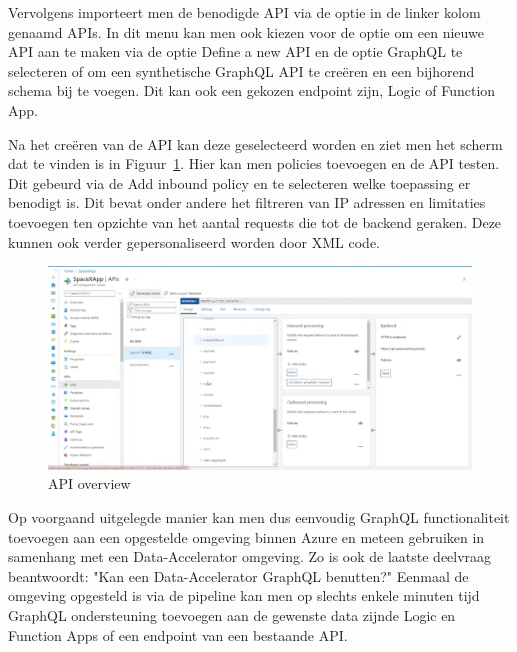 Vervolgens importeert men de benodigde API via de optie in de linker kolom genaamd APIs. In dit menu kan men ook kiezen voor de optie om een nieuwe API aan te maken via de optie Define a new API en de optie GraphQL te selecteren of om een synthetische GraphQL API te creëren en een bijhorend schema bij te voegen. Dit kan ook een gekozen endpoint zijn, Logic of Function App.

Na het creëren van de API kan deze geselecteerd worden en ziet men het scherm dat te vinden is in Figuur~\ref{fig:API}. Hier kan men policies toevoegen en de API testen. Dit gebeurd via de Add inbound policy en te selecteren welke toepassing er benodigt is. Dit bevat onder andere het filtreren van IP adressen en limitaties toevoegen ten opzichte van het aantal requests die tot de backend geraken. Deze kunnen ook verder gepersonaliseerd worden door XML code.

\begin{figure}
    \centering
    \includegraphics[scale=0.30]{../img/API.png}
    \caption{\label{fig:API}API overview}
\end{figure}

Op voorgaand uitgelegde manier kan men dus eenvoudig GraphQL functionaliteit toevoegen aan een opgestelde omgeving binnen Azure en meteen gebruiken in samenhang met een Data-Accelerator omgeving. Zo is ook de laatste deelvraag beantwoordt: "Kan een Data-Accelerator GraphQL benutten?" Eenmaal de omgeving opgesteld is via de pipeline kan men op slechts enkele minuten tijd GraphQL ondersteuning toevoegen aan de gewenste data zijnde Logic en Function Apps of een endpoint van een bestaande API.




